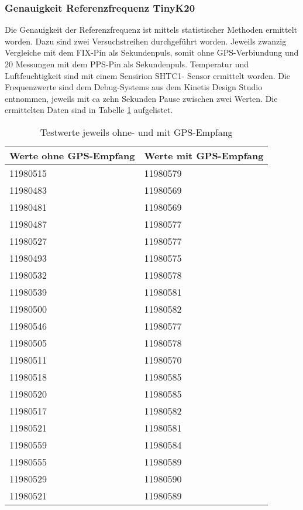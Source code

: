 \subsubsection{Genauigkeit Referenzfrequenz TinyK20}
Die Genauigkeit der Referenzfrequenz ist mittels statistischer Methoden ermittelt worden. Dazu sind zwei Versuchstreihen durchgeführt worden. Jeweils zwanzig Vergleiche mit dem FIX-Pin als Sekundenpuls, somit ohne GPS-Verbiundung und 20 Messungen mit dem PPS-Pin als Sekundenpuls. Temperatur und Luftfeuchtigkeit sind mit einem Sensirion SHTC1- Sensor ermittelt worden.
Die Frequenzwerte sind dem Debug-Systems aus dem Kinetis Design Studio entnommen, jeweils mit ca zehn Sekunden Pause zwischen zwei Werten. Die ermittelten Daten sind in Tabelle \ref{tab:testvalues} aufgelistet.
\begin{table}[H]
	\centering
	\begin{tabular}{|l|l|} \hline
		\textbf{Werte ohne GPS-Empfang}	& \textbf{Werte mit GPS-Empfang} \\ \hline
		11980515						& 11980579 \\ \hline
		11980483						& 11980569 \\ \hline
		11980481						& 11980569 \\ \hline
		11980487						& 11980577 \\ \hline
		11980527						& 11980577 \\ \hline
		11980493						& 11980575 \\ \hline
		11980532						& 11980578 \\ \hline
		11980539						& 11980581 \\ \hline
		11980500						& 11980582 \\ \hline
		11980546						& 11980577 \\ \hline
		11980505						& 11980578 \\ \hline
		11980511						& 11980570 \\ \hline
		11980518						& 11980585 \\ \hline
		11980520						& 11980585 \\ \hline
		11980517						& 11980582 \\ \hline
		11980521						& 11980581 \\ \hline
		11980559						& 11980584 \\ \hline
		11980555						& 11980589 \\ \hline
		11980529						& 11980590 \\ \hline 
		11980521						& 11980589 \\ \hline
	\end{tabular}
	\caption{Testwerte jeweils ohne- und mit GPS-Empfang}
	\label{tab:testvalues}
\end{table}
